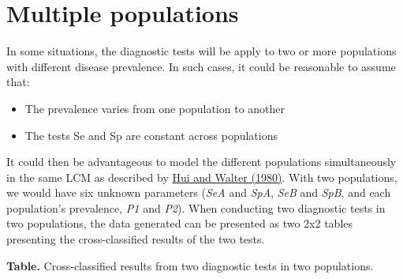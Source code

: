 \documentclass[
]{book}
\providecommand{\tightlist}{%
  \setlength{\itemsep}{0pt}\setlength{\parskip}{0pt}}
\begin{document}
\chapter{Multiple populations}\label{multiple-populations}

In some situations, the diagnostic tests will be apply to two or more populations with different disease prevalence. In such cases, it could be reasonable to assume that:

\begin{itemize}
\tightlist
\item
  The prevalence varies from one population to another\\
\item
  The tests Se and Sp are constant across populations
\end{itemize}

It could then be advantageous to model the different populations simultaneously in the same LCM as described by \href{https://www.jstor.org/stable/2530508?seq=1}{Hui and Walter (1980)}. With two populations, we would have six unknown parameters (\emph{SeA} and \emph{SpA}, \emph{SeB} and \emph{SpB}, and each population's prevalence, \emph{P1} and \emph{P2}). When conducting two diagnostic tests in two populations, the data generated can be presented as two 2x2 tables presenting the cross-classified results of the two tests.

\textbf{Table.} Cross-classified results from two diagnostic tests in two populations.
\end{document}
